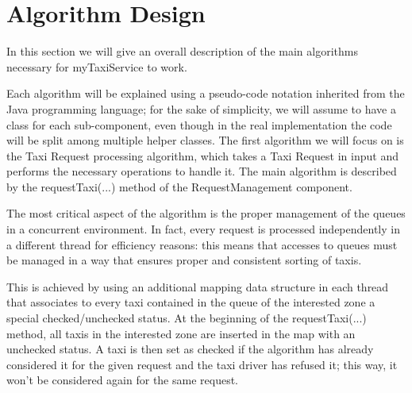 \chapter{Algorithm Design}
In this section we will give an overall description of the main algorithms necessary for myTaxiService to work. 

Each algorithm will be explained using a pseudo-code notation inherited from the Java programming language; for the sake of simplicity, we will assume to have a class for each sub-component, even though in the real implementation the code will be split among multiple helper classes.
\vspace{5px}
\linebreak
The first algorithm we will focus on is the Taxi Request processing algorithm, which takes a Taxi Request in input and performs the necessary operations to handle it. The main algorithm is described by the requestTaxi(...) method of the RequestManagement component.

The most critical aspect of the algorithm is the proper management of the queues in a concurrent environment. In fact, every request is processed independently in a different thread for efficiency reasons: this means that accesses to queues must be managed in a way that ensures proper and consistent sorting of taxis.

This is achieved by using an additional mapping data structure in each thread that associates to every taxi contained in the queue of the interested zone a special checked/unchecked status. 
At the beginning of the requestTaxi(...) method, all taxis in the interested zone are inserted in the map with an unchecked status. A taxi is then set as checked if the algorithm has already considered it for the given request and the taxi driver has refused it; this way, it won't be considered again for the same request. 

